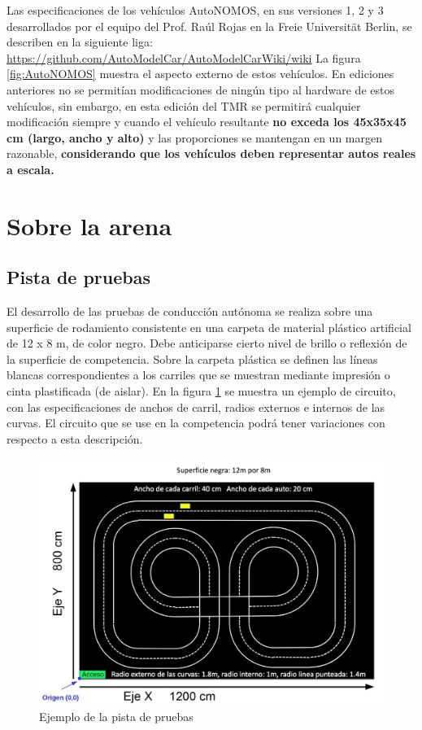 \documentclass[letterpaper,12pt]{article}
\begin{document}
Las especificaciones de los vehículos AutoNOMOS, en sus versiones 1, 2 y 3 desarrollados por el equipo del Prof. Raúl Rojas en la Freie Universität Berlin, se describen en la siguiente liga:
\url{https://github.com/AutoModelCar/AutoModelCarWiki/wiki}
La figura \ref{fig:AutoNOMOS} muestra el aspecto externo de estos vehículos. En ediciones anteriores no se permitían modificaciones de ningún tipo al hardware de estos vehículos, sin embargo, en esta edición del TMR se permitirá cualquier modificación siempre y cuando el vehículo resultante \textbf{no exceda los 45x35x45 cm (largo, ancho y alto)} y las proporciones se mantengan en un margen razonable, \textbf{considerando que los vehículos deben representar autos reales a escala. }


\section{Sobre la arena}
\subsection{Pista de pruebas}
El desarrollo de las pruebas de conducción autónoma se realiza sobre una superficie de rodamiento consistente en una carpeta de material plástico artificial de 12 x 8 m, de color negro. Debe anticiparse cierto nivel de brillo o reflexión de la superficie de competencia. Sobre la carpeta plástica se definen las líneas blancas correspondientes a los carriles que se muestran mediante impresión o cinta plastificada (de aislar). En la figura \ref{fig:Arena} se muestra un ejemplo de circuito, con las especificaciones de anchos de carril, radios externos e internos de las curvas. El circuito que se use en la competencia podrá tener variaciones con respecto a esta descripción.

\begin{figure}[h!]
  \centering
  \includegraphics[width=\textwidth]{Figures/pista.png}
  \caption{Ejemplo de la pista de pruebas}
  \label{fig:Arena}
\end{figure}
\end{document}
